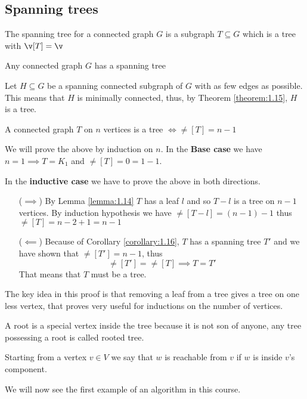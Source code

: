 \subsection{Spanning trees}
\begin{definition}
    The spanning tree for a connected graph $G$ is a subgraph $T \subseteq G$ which is a tree with $\v[T] = \v$
\end{definition}
\begin{customcorollary}{1.16}
    \label{corollary:1.16}
    Any connected graph $G$ has a spanning tree
\end{customcorollary}
\begin{prf}
    Let $H \subseteq G$ be a spanning connected subgraph of $G$ with as few edges as possible. This means that $H$ is minimally connected, thus, by Theorem \ref{theorem:1.15}, $H$ is a tree.
\end{prf}
\begin{customtheorem}{1.17}
    \label{theorem:1.17}
    A connected graph $T$ on $n$ vertices is a tree $\iff \ne[T] = n - 1$
\end{customtheorem}
\begin{prf}
    We will prove the above by induction on $n$. In the \textbf{Base case} we have $n = 1 \implies T = K_1$ and $\ne[T] = 0 = 1 - 1$.

    In the \textbf{inductive case} we have to prove the above in both directions.
    \begin{itemize}
        \item [($\implies$)] By Lemma \ref{lemma:1.14} $T$ has a leaf $l$ and so $T - l$ is a tree on $n - 1$ vertices. By induction hypothesis we have $\ne[T - l] = (n - 1) - 1$ thus $\ne[T] = n - 2 + 1 = n - 1$
        \item [($\impliedby$)] Because of Corollary \ref{corollary:1.16}, $T$ has a spanning tree $T'$ and we have shown that $\ne[T'] = n - 1$, thus
        \begin{equation*}
            \ne[T'] = \ne[T] \implies T = T'
        \end{equation*}
        That means that $T$ must be a tree.
    \end{itemize}
\end{prf}
\begin{coolfact}
    The key idea in this proof is that removing a leaf from a tree gives a tree on one less vertex, that proves very useful for inductions on the number of vertices.
\end{coolfact}
\begin{definition}[Root]
    A root is a special vertex inside the tree because it is not son of anyone, any tree possessing a root is called rooted tree.
\end{definition}
\begin{definition}[Reachability]
    Starting from a  vertex $v \in V$ we say that $w$ is reachable from $v$ if $w$ is inside $v$'s component.
\end{definition}
We will now see the first example of an algorithm in this course.

